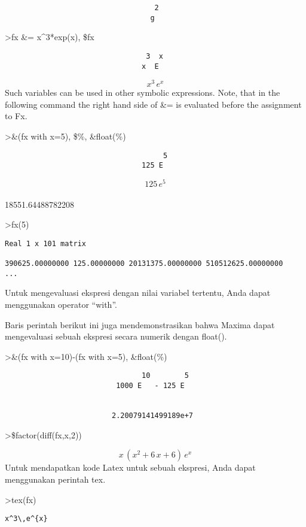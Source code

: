\documentclass[
]{book}
\begin{document}
\begin{verbatim}
                                   2
                                  g
\end{verbatim}

\textgreater fx \&= x\^{}3*exp(x), \$fx

\begin{verbatim}
                                 3  x
                                x  E
\end{verbatim}

\[x^3\,e^{x}\]Such variables can be used in other symbolic expressions. Note, that in the following command the right hand side of \&= is evaluated before the assignment to Fx.

\textgreater\&(fx with x=5), \$\%, \&float(\%)

\begin{verbatim}
                                     5
                                125 E
\end{verbatim}

\[125\,e^5\]\\
18551.64488782208

\textgreater fx(5)

\begin{verbatim}
Real 1 x 101 matrix

390625.00000000 125.00000000 20131375.00000000 510512625.00000000     ...
\end{verbatim}

Untuk mengevaluasi ekspresi dengan nilai variabel tertentu, Anda dapat menggunakan operator ``with''.

Baris perintah berikut ini juga mendemonstrasikan bahwa Maxima dapat mengevaluasi sebuah ekspresi secara numerik dengan float().

\textgreater\&(fx with x=10)-(fx with x=5), \&float(\%)

\begin{verbatim}
                                10        5
                          1000 E   - 125 E


                         2.20079141499189e+7
\end{verbatim}

\textgreater\$factor(diff(fx,x,2))

\[x\,\left(x^2+6\,x+6\right)\,e^{x}\]Untuk mendapatkan kode Latex untuk sebuah ekspresi, Anda dapat menggunakan perintah tex.

\textgreater tex(fx)

\begin{verbatim}
x^3\,e^{x}
\end{verbatim}
\end{document}
